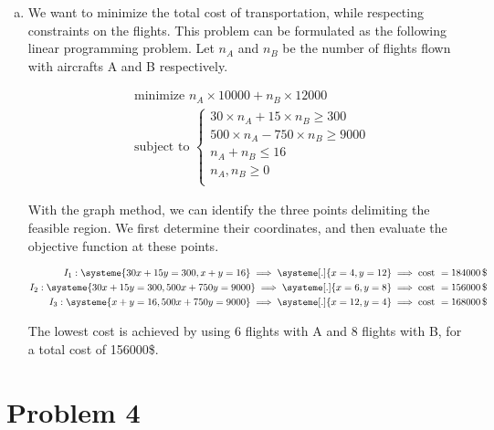 \documentclass[a4paper, 10pt, twoside]{article}
\begin{document}
\begin{enumerate}[a)]
    \item We want to minimize the total cost of transportation, while respecting constraints on the flights. This problem can be formulated as the following linear programming problem.
    Let $n_{A}$ and $n_{B}$ be the number of flights flown with aircrafts A and B respectively. 

    \begin{align*}
        & \text{minimize } n_{A} \times 10000 + n_{B} \times 12000 \\
        & \text{subject to }
       \begin{cases}
           30 \times n_{A} + 15 \times n_{B} \ge 300 \\
           500 \times n_{A} - 750 \times n_{B} \ge 9000 \\
           n_{A} + n_{B} \le 16 \\
           n_{A}, n_{B} \ge 0 \\
       \end{cases}
   \end{align*}

   With the graph method, we can identify the three points delimiting the feasible region. We first determine their coordinates, and then evaluate the objective function at these points.

    \begin{align*}
        I_1 : 
        \systeme{
            30x+15y=300,
            x+y=16
        }
        \implies
        \systeme[.]{
            x=4,
            y=12
        }
        \implies \text{cost } = 184000\,\$ \\
        I_2 : 
        \systeme{
            30x+15y=300,
            500x+750y=9000
        }
        \implies
        \systeme[.]{
            x=6,
            y=8
        }
        \implies \text{cost } = 156000\,\$ \\
        I_3 : 
        \systeme{
            x+y=16,
            500x+750y=9000
        }
        \implies
        \systeme[.]{
            x=12,
            y=4
        }
        \implies \text{cost } = 168000\,\$ \\
    \end{align*}

    The lowest cost is achieved by using 6 flights with A and 8 flights with B, for a total cost of 156000\$.
   
\end{enumerate}

\section*{Problem 4}
\end{document}
